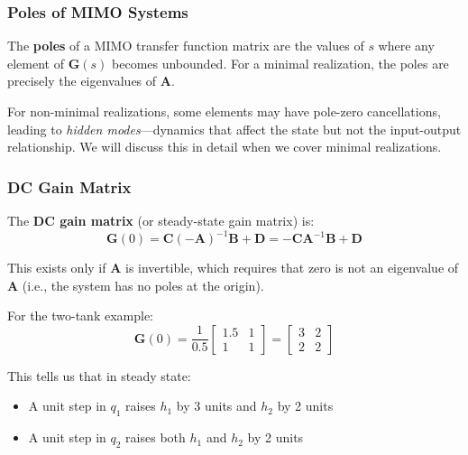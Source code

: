 \subsubsection{Poles of MIMO Systems}

The \textbf{poles} of a MIMO transfer function matrix are the values of $s$ where any element of $\mathbf{G}(s)$ becomes unbounded. For a minimal realization, the poles are precisely the eigenvalues of $\mathbf{A}$.


For non-minimal realizations, some elements may have pole-zero cancellations, leading to \textit{hidden modes}---dynamics that affect the state but not the input-output relationship. We will discuss this in detail when we cover minimal realizations.

\subsubsection{DC Gain Matrix}

The \textbf{DC gain matrix} (or steady-state gain matrix) is:
\begin{equation}
\mathbf{G}(0) = \mathbf{C}(-\mathbf{A})^{-1}\mathbf{B} + \mathbf{D} = -\mathbf{C}\mathbf{A}^{-1}\mathbf{B} + \mathbf{D}
\end{equation}

This exists only if $\mathbf{A}$ is invertible, which requires that zero is not an eigenvalue of $\mathbf{A}$ (i.e., the system has no poles at the origin).

For the two-tank example:
\begin{equation}
\mathbf{G}(0) = \frac{1}{0.5}\begin{bmatrix} 1.5 & 1 \\ 1 & 1 \end{bmatrix} = \begin{bmatrix} 3 & 2 \\ 2 & 2 \end{bmatrix}
\end{equation}

This tells us that in steady state:
\begin{itemize}
\item A unit step in $q_1$ raises $h_1$ by 3 units and $h_2$ by 2 units
\item A unit step in $q_2$ raises both $h_1$ and $h_2$ by 2 units
\end{itemize}

